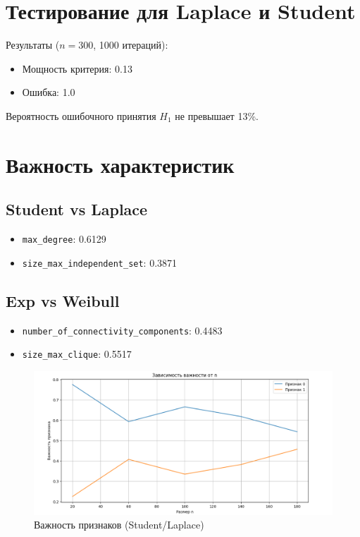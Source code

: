 \documentclass{HSEtitle}
\begin{document}
\section{Тестирование для Laplace и Student}

Результаты ($n=300$, 1000 итераций):
\begin{itemize}
    \item Мощность критерия: 0.13
    \item Ошибка: 1.0
\end{itemize}
Вероятность ошибочного принятия $H_1$ не превышает 13\%.

\section{Важность характеристик}

\subsection{Student vs Laplace}
\begin{itemize}
    \item \texttt{max\_degree}: 0.6129
    \item \texttt{size\_max\_independent\_set}: 0.3871
\end{itemize}

\subsection{Exp vs Weibull}
\begin{itemize}
    \item \texttt{number\_of\_connectivity\_components}: 0.4483
    \item \texttt{size\_max\_clique}: 0.5517
\end{itemize}

\begin{figure}[H]
    \centering
    \includegraphics[width=0.7\linewidth]{importance1.png}
    \caption{Важность признаков (Student/Laplace)}
    \label{fig:importance1}
\end{figure}
\end{document}
